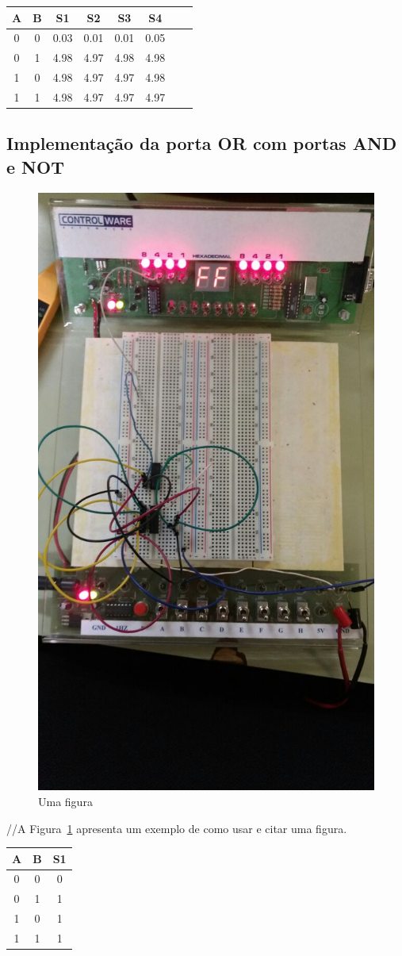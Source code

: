 \documentclass[12pt]{article}
\begin{document}
\begin{table}
	\centering
	\begin{tabular}{|c|c|c|c|c|c|c|c|}
	\cline{1-6}
	\multicolumn{1}{|c|}{A} & \multicolumn{1}{|c|}{B} & \multicolumn{1}{|c|}{S1} & \multicolumn{1}{|c|}{S2} & \multicolumn{1}{|c|}{S3} & \multicolumn{1}{|c|}{S4}\\
	\hline
	0 & 0 & 0.03 & 0.01 & 0.01 & 0.05\\
	0 & 1 & 4.98 & 4.97 & 4.98 & 4.98\\
	1 & 0 & 4.98 & 4.97 & 4.97 & 4.98\\
	1 & 1 & 4.98 & 4.97 & 4.97 & 4.97\\
	\hline
	\end{tabular}
	\label{Porta OR}
\end{table}


\subsection{Implementação da porta OR com portas AND e NOT}
\label{sec:NOTAND}

\begin{figure}[H]
\centering
\includegraphics[width=.5\textwidth]{Porta_OR.jpeg}
\caption{Uma figura}
\label{fig:portaor}
\end{figure}

//A Figura~\ref{fig:portaor} apresenta um exemplo de como usar e citar uma figura.

\begin{table}
	\centering
	\begin{tabular}{|c|c|c|}
	\cline{1-3}
	\multicolumn{1}{|c|}{A} & \multicolumn{1}{|c|}{B} & \multicolumn{1}{|c|}{S1}\\
	\hline
	0 & 0 & 0\\
	0 & 1 & 1\\
	1 & 0 & 1\\
	1 & 1 & 1\\
	\hline
	\end{tabular}
	\label{ANDNOTOR}
\end{table}
\end{document}

